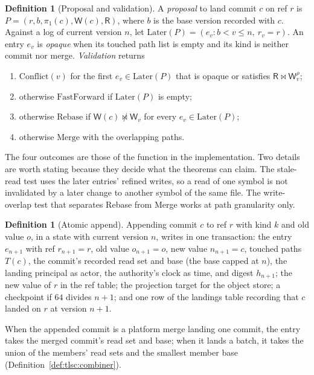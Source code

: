 \documentclass[11pt,letterpaper]{article}
\theoremstyle{definition}
\newtheorem{definition}[theorem]{Definition}
\theoremstyle{remark}
\newcommand{\R}{\mathsf{R}}
\newcommand{\W}{\mathsf{W}}
\newcommand{\meets}{\bowtie}
\newcommand{\nmeets}{\not\bowtie}
\newcommand{\Later}{\mathrm{Later}}
\newcommand{\fp}{\pi_1}
\begin{document}
\begin{definition}[Proposal and validation]
\label{def:tlsc:validation}
A \emph{proposal} to land commit $c$ on ref $r$ is $P=(r,b,\fp(c),\W(c),\R)$, where $b$ is the base version recorded with $c$. Against a log of current version $n$, let $\Later(P)=(e_v : b<v\leq n,\ r_v=r)$. An entry $e_v$ is \emph{opaque} when its touched path list is empty and its kind is neither commit nor merge. \emph{Validation} returns
\begin{enumerate}
\item $\mathrm{Conflict}(v)$ for the first $e_v\in\Later(P)$ that is opaque or satisfies $\R\meets\W^{\rho}_v$;
\item otherwise $\mathrm{FastForward}$ if $\Later(P)$ is empty;
\item otherwise $\mathrm{Rebase}$ if $\W(c)\nmeets\W_v$ for every $e_v\in\Later(P)$;
\item otherwise $\mathrm{Merge}$ with the overlapping paths.
\end{enumerate}
\end{definition}

The four outcomes are those of the function  in the implementation. Two details are worth stating because they decide what the theorems can claim. The stale-read test uses the later entries' refined writes, so a read of one symbol is not invalidated by a later change to another symbol of the same file. The write-overlap test that separates Rebase from Merge works at path granularity only.

\begin{definition}[Atomic append]
\label{def:tlsc:append}
Appending commit $c$ to ref $r$ with kind $k$ and old value $o$, in a state with current version $n$, writes in one transaction: the entry $e_{n+1}$ with ref $r_{n+1}=r$, old value $o_{n+1}=o$, new value $n_{n+1}=c$, touched paths $T(c)$, the commit's recorded read set and base (the base capped at $n$), the landing principal as actor, the authority's clock as time, and digest $h_{n+1}$; the new value of $r$ in the ref table; the projection target for the object store; a checkpoint if $64$ divides $n+1$; and one row of the landings table recording that $c$ landed on $r$ at version $n+1$. %
\end{definition}

When the appended commit is a platform merge landing one commit, the entry takes the merged commit's read set and base; when it lands a batch, it takes the union of the members' read sets and the smallest member base (Definition~\ref{def:tlsc:combiner}).
\end{document}
